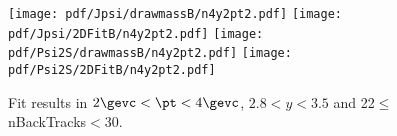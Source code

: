 \begin{figure}[H]
\begin{center}
\texttt{[image: pdf/Jpsi/drawmassB/n4y2pt2.pdf]}
\texttt{[image: pdf/Jpsi/2DFitB/n4y2pt2.pdf]}
\vspace*{-0.5cm}
\texttt{[image: pdf/Psi2S/drawmassB/n4y2pt2.pdf]}
\texttt{[image: pdf/Psi2S/2DFitB/n4y2pt2.pdf]}
\vspace*{-0.5cm}
\end{center}
\caption{Fit results in $2\gevc<\pt<4\gevc$, $2.8<y<3.5$ and 22$\leq$nBackTracks$<$30.}
\label{Fitn4y2pt2}
\end{figure}
